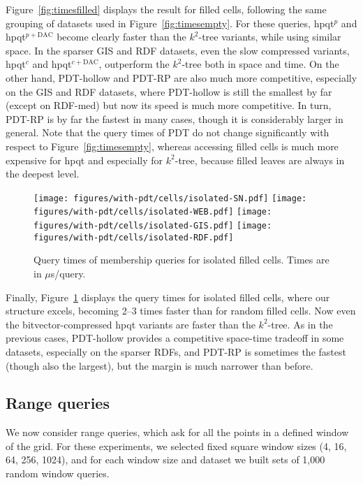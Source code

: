 \documentclass{elsarticle}
\newcommand{\DAC}{\ensuremath{\mathrm{DAC}}}
\newcommand{\kt}{$k^2$-tree\xspace}
\newcommand{\rdfm}{\textsf{RDF-med}\xspace}
\newcommand{\hpqt}{\textsf{hpqt}\xspace}
\newcommand{\hpqtp}{\textsf{hpqt$^p$}\xspace}
\newcommand{\hpqtR}{\textsf{hpqt$^{c}$}\xspace}
\newcommand{\hpqtpdac}{\textsf{hpqt$^{p+\DAC}$}\xspace}
\newcommand{\hpqtRdac}{\textsf{hpqt$^{c+\DAC}$}\xspace}
\newcommand{\pdt}{PDT\xspace}
\newcommand{\pdth}{PDT-hollow\xspace}
\newcommand{\pdtrp}{PDT-RP\xspace}
\begin{document}
Figure~\ref{fig:timesfilled} displays the result for filled cells, following the same grouping of datasets used in Figure~\ref{fig:timesempty}. For these queries, \hpqtp and \hpqtpdac become clearly faster than the \kt variants, while using similar space. In the sparser GIS and RDF datasets, even the slow compressed variants, \hpqtR and \hpqtRdac, outperform the \kt both in space and time. On the other hand, \pdth and \pdtrp are also much more competitive, especially on the GIS and RDF datasets, where \pdth is still the smallest by far (except on \rdfm) but now its speed is much more competitive. In turn, \pdtrp is by far the fastest in many cases, though it is considerably larger in general. Note that the query times of \pdt do not change significantly with respect to Figure~\ref{fig:timesempty}, whereas accessing filled cells is much more expensive for \hpqt and especially for \kt, because filled leaves are always in the deepest level. 

\begin{figure}[t]
\begin{center}
\texttt{[image: figures/with-pdt/cells/isolated-SN.pdf]}
\texttt{[image: figures/with-pdt/cells/isolated-WEB.pdf]}
\texttt{[image: figures/with-pdt/cells/isolated-GIS.pdf]}
\texttt{[image: figures/with-pdt/cells/isolated-RDF.pdf]}
\end{center}
\caption{Query times of membership queries for isolated filled cells. Times are in $\mu$s/query.}
\label{fig:timesisolated}
\end{figure}

Finally, Figure~\ref{fig:timesisolated} displays the query times for isolated filled cells, where our structure excels, becoming 2--3 times faster than for random filled cells. Now even the bitvector-compressed \hpqt variants are faster than the \kt. As in the previous cases, \pdth provides a competitive space-time tradeoff in some datasets, especially on the sparser RDFs, and \pdtrp is sometimes the fastest (though also the largest), but the margin is much narrower than before. 

\subsection{Range queries}

We now consider range queries, which ask for all the points in a defined window of the grid. 
For these experiments, we selected fixed square window sizes (4, 16, 64, 256, 1024), and for each window size and dataset we built sets of 1,000 random window queries.
\end{document}
